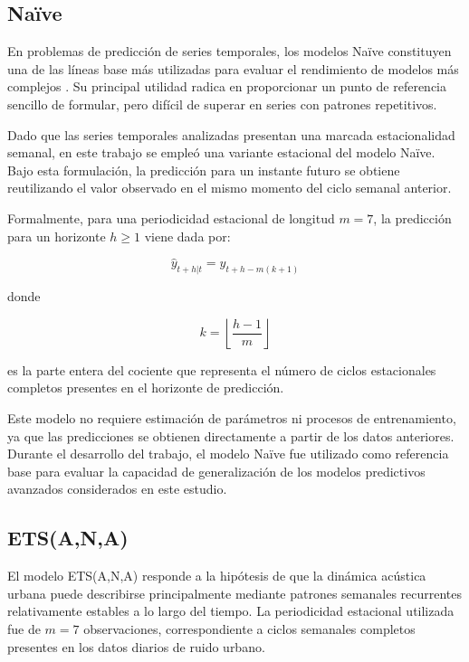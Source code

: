\subsection{Naïve}
\label{cap5:modelos:naive}

En problemas de predicción de series temporales, los modelos Naïve constituyen una de las líneas base más utilizadas para evaluar el rendimiento de modelos más complejos \parencite{Suavizado:Hyndman}. Su principal utilidad radica en proporcionar un punto de referencia sencillo de formular, pero difícil de superar en series con patrones repetitivos.

Dado que las series temporales analizadas presentan una marcada estacionalidad semanal, en este trabajo se empleó una variante estacional del modelo Naïve. Bajo esta formulación, la predicción para un instante futuro se obtiene reutilizando el valor observado en el mismo momento del ciclo semanal anterior.

Formalmente, para una periodicidad estacional de longitud $m=7$, la predicción para un horizonte $h \geq 1$ viene dada por:

\begin{equation}
    \hat{y}_{t+h|t} = y_{t+h-m(k+1)}
\end{equation}

donde

\begin{equation}
    k = \left\lfloor \frac{h-1}{m} \right\rfloor
\end{equation}

es la parte entera del cociente que representa el número de ciclos estacionales completos presentes en el horizonte de predicción.

Este modelo no requiere estimación de parámetros ni procesos de entrenamiento, ya que las predicciones se obtienen directamente a partir de los datos anteriores. Durante el desarrollo del trabajo, el modelo Naïve fue utilizado como referencia base para evaluar la capacidad de generalización de los modelos predictivos avanzados considerados en este estudio.

\subsection{ETS(A,N,A)}
\label{cap5:modelos:ana}

El modelo ETS(A,N,A) responde a la hipótesis de que la dinámica acústica urbana puede describirse principalmente mediante patrones semanales recurrentes relativamente estables a lo largo del tiempo. La periodicidad estacional utilizada fue de $m=7$ observaciones, correspondiente a ciclos semanales completos presentes en los datos diarios de ruido urbano.

